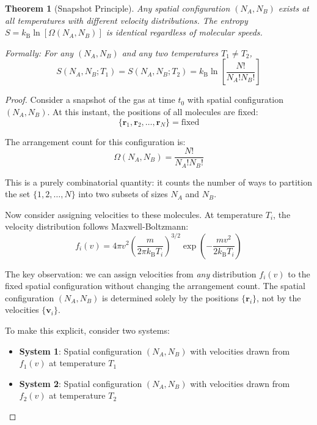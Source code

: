 \documentclass[10pt,twocolumn,letterpaper]{article}
\newtheorem{theorem}{Theorem}[section]
\theoremstyle{definition}
\theoremstyle{remark}
\newcommand{\kb}{k_\text{B}}
\newcommand{\Om}{\Omega}
\begin{document}
\begin{theorem}[Snapshot Principle]
\label{thm:snapshot}
Any spatial configuration $(N_A, N_B)$ exists at all temperatures with different velocity distributions. The entropy $S = \kb \ln[\Om(N_A, N_B)]$ is identical regardless of molecular speeds.

Formally: For any $(N_A, N_B)$ and any two temperatures $T_1 \neq T_2$,
\begin{equation}
S(N_A, N_B; T_1) = S(N_A, N_B; T_2) = \kb \ln\left[\frac{N!}{N_A! N_B!}\right]
\label{eq:snapshot_equality}
\end{equation}
\end{theorem}

\begin{proof}
Consider a snapshot of the gas at time $t_0$ with spatial configuration $(N_A, N_B)$. At this instant, the positions of all molecules are fixed:
\begin{equation}
\{\mathbf{r}_1, \mathbf{r}_2, \ldots, \mathbf{r}_N\} = \text{fixed}
\end{equation}

The arrangement count for this configuration is:
\begin{equation}
\Om(N_A, N_B) = \frac{N!}{N_A! N_B!}
\end{equation}

This is a purely combinatorial quantity: it counts the number of ways to partition the set $\{1, 2, \ldots, N\}$ into two subsets of sizes $N_A$ and $N_B$.

Now consider assigning velocities to these molecules. At temperature $T_i$, the velocity distribution follows Maxwell-Boltzmann:
\begin{equation}
f_i(v) = 4\pi v^2 \left(\frac{m}{2\pi \kb T_i}\right)^{3/2} \exp\left(-\frac{mv^2}{2\kb T_i}\right)
\label{eq:maxwell_boltzmann}
\end{equation}

The key observation: we can assign velocities from \textit{any} distribution $f_i(v)$ to the fixed spatial configuration without changing the arrangement count. The spatial configuration $(N_A, N_B)$ is determined solely by the positions $\{\mathbf{r}_i\}$, not by the velocities $\{\mathbf{v}_i\}$.

To make this explicit, consider two systems:
\begin{itemize}
\item \textbf{System 1}: Spatial configuration $(N_A, N_B)$ with velocities drawn from $f_1(v)$ at temperature $T_1$
\item \textbf{System 2}: Spatial configuration $(N_A, N_B)$ with velocities drawn from $f_2(v)$ at temperature $T_2$
\end{itemize}


\end{proof}
\end{document}

